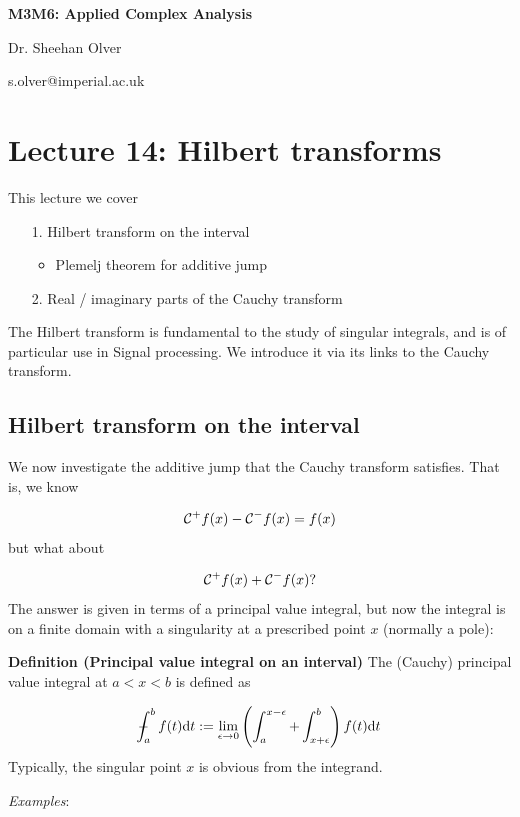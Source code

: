 \documentclass[12pt,a4paper]{article}
\def\D{ {\rm d} }
\def\CC{ {\cal C} }
\def\Xint#1{ \mathchoice
   {\XXint\displaystyle\textstyle{#1} }%
   {\XXint\textstyle\scriptstyle{#1} }%
   {\XXint\scriptstyle\scriptscriptstyle{#1} }%
   {\XXint\scriptscriptstyle\scriptscriptstyle{#1} }%
   \!\int}
\def\XXint#1#2#3{ {\setbox0=\hbox{$#1{#2#3}{\int}$}
     \vcenter{\hbox{$#2#3$}}\kern-.5\wd0} }
\def\dashint{\Xint-}
\def\dt{\D t}
\begin{document}
\textbf{M3M6: Applied Complex Analysis}

Dr. Sheehan Olver

s.olver@imperial.ac.uk

\section{Lecture 14: Hilbert transforms}
This lecture we cover 

\begin{itemize}
\item[1. ] Hilbert transform on the interval

\begin{itemize}
\item Plemelj theorem for additive jump

\end{itemize}

\item[2. ] Real / imaginary parts of the Cauchy transform

\end{itemize}
The Hilbert transform is fundamental to the study of singular integrals, and is of particular use in Signal processing. We introduce it via its links to the Cauchy transform.

\subsection{Hilbert transform on the interval}
We now investigate the additive jump that the Cauchy transform satisfies. That is, we know

\[
    \CC^+ f(x) - \CC^- f(x) = f(x)
\]
but what about 

\[
    \CC^+ f(x) + \CC^- f(x)?
\]
The answer is given in terms of a principal value integral, but now the integral is on a finite domain with a singularity at a prescribed point $x$ (normally a pole):

\textbf{Definition (Principal value integral on an interval)}  The (Cauchy) principal value integral at $a < x < b$ is defined as

\[
\dashint_a^b f(t) \dt := \lim_{\epsilon \rightarrow 0} \left(\int_a^{x - \epsilon} + \int_{x + \epsilon}^b \right) f(t) \dt
\]
Typically, the singular point $x$ is obvious from the integrand.

\emph{Examples}:
\end{document}
